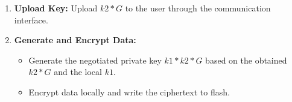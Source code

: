 \documentclass[main\_\_EN.tex]{subfiles}
\begin{document}
\begin{enumerate}
\begin{enumerate}
        \item After entering the GAIN phase, read out \hyperref[para:keyinfo]{\begin{math}key\_info\end{math}} and \begin{math}k2*G\end{math}, then configure \hyperref[fielddesc:KEYMNGCONTINUE]{KEYMNG\_CONTINUE}.
        \item Wait for the Key Manager to return to the IDLE phase.
    \end{enumerate}
    \item \textbf{Upload Key:} Upload \begin{math}k2*G\end{math} to the user through the communication interface.
    \item \textbf{Generate and Encrypt Data:}
    \begin{itemize}
        \item Generate the negotiated private key \begin{math}k1*k2*G\end{math} based on the obtained \begin{math}k2*G\end{math} and the local \begin{math}k1\end{math}.
        \item Encrypt data locally and write the ciphertext to flash.
    \end{itemize}
\end{enumerate}
\end{document}

